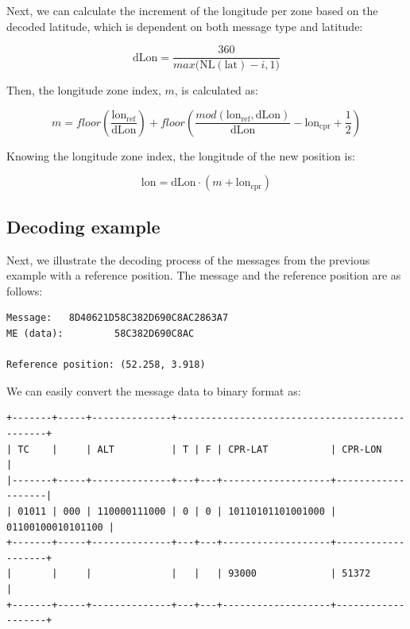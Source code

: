 Next, we can calculate the increment of the longitude per zone based on the decoded latitude, which is dependent on both message type and latitude:

\begin{equation}
  \mathrm{dLon} = \frac{360}{max\Big( \mathrm{NL}(\mathrm{lat})-i, 1 \Big)}
\end{equation}


Then, the longitude zone index, $m$, is calculated as:

\begin{equation}
  m = floor \left( \frac{\mathrm{lon}_\mathrm{ref}}{\mathrm{dLon}} \right) + floor \left( \frac{mod(\mathrm{lon}_\mathrm{ref}, \mathrm{dLon})}{\mathrm{dLon}}  - \mathrm{lon}_\mathrm{cpr}  + \frac{1}{2}  \right)
\end{equation}

Knowing the longitude zone index, the longitude of the new position is:

\begin{equation}
  \mathrm{lon} = \mathrm{dLon} \cdot (m + \mathrm{lon}_\mathrm{cpr})
\end{equation}


\subsection{Decoding example}

Next, we illustrate the decoding process of the messages from the previous example with a reference position. The message and the reference position are as follows:

\begin{verbatim}
Message:   8D40621D58C382D690C8AC2863A7
ME (data):         58C382D690C8AC

Reference position: (52.258, 3.918)
\end{verbatim}

We can easily convert the message data to binary format as:

\begin{verbatim}
+-------+-----+--------------+-----------------------------------------------+
| TC    |     | ALT          | T | F | CPR-LAT           | CPR-LON           |
|-------+-----+--------------+---+---+-------------------+-------------------|
| 01011 | 000 | 110000111000 | 0 | 0 | 10110101101001000 | 01100100010101100 |
+-------+-----+--------------+---+---+-------------------+-------------------+
|       |     |              |   |   | 93000             | 51372             |
+-------+-----+--------------+---+---+-------------------+-------------------+
\end{verbatim}

